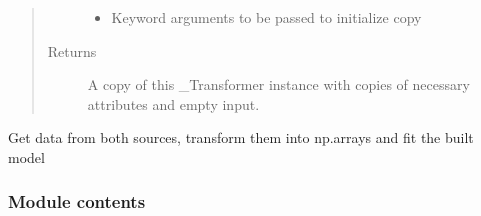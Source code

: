 \documentclass[letterpaper,10pt,english]{sphinxmanual}
\begin{document}
\begin{fulllineitems}
\begin{fulllineitems}
\begin{quote}
\begin{description}
\begin{itemize}
\item {} 
 \textendash{} Keyword arguments to be passed to initialize copy

\end{itemize}

\item[{Returns}] \leavevmode
A copy of this \_Transformer instance with copies of necessary
attributes and empty input.

\end{description}\end{quote}

\end{fulllineitems}


\begin{fulllineitems}
\label{\detokenize{dalio.model:dalio.model.statistical.XYLinearModel.run}}
Get data from both sources, transform them into np.arrays and
fit the built model

\end{fulllineitems}


\end{fulllineitems}



\subsubsection{Module contents}
\label{\detokenize{dalio.model:module-dalio.model}}\label{\detokenize{dalio.model:module-contents}}
\end{document}
